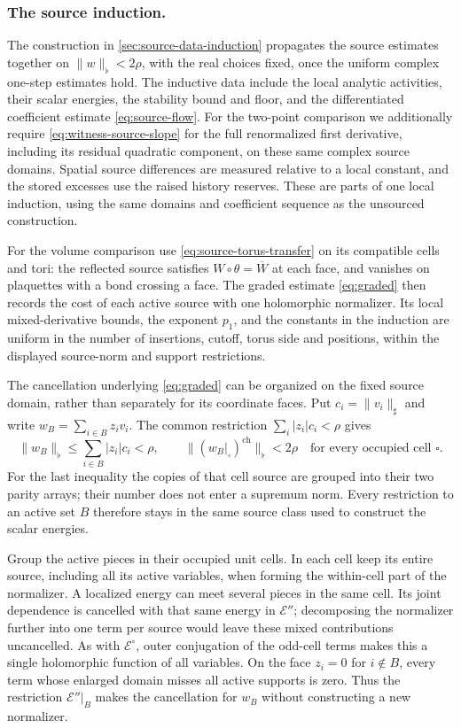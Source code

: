 \documentclass[11pt,letterpaper,reqno]{amsart}
\theoremstyle{definition}
\theoremstyle{remark}
\begin{document}
\subsubsection*{The source induction.}
\label{hyp:sourced-estimates}
The construction in \cref{sec:source-data-induction} propagates the
source estimates together on $\|w\|_\flat<2\rho$, with the real
choices fixed, once the uniform complex one-step estimates hold. The
inductive data include the local analytic activities, their scalar
energies, the stability bound and floor, and the differentiated
coefficient estimate \eqref{eq:source-flow}. For the two-point comparison
we additionally require \eqref{eq:witness-source-slope} for the full
renormalized first derivative, including its residual quadratic
component, on these same complex source domains. Spatial source
differences are measured relative to a local constant, and the stored
excesses use the raised history reserves. These are parts of one local induction, using the
same domains and coefficient sequence as the unsourced construction.

For the volume comparison use \eqref{eq:source-torus-transfer} on its
compatible cells and tori: the reflected source satisfies
$W\circ\theta=\overline W$ at each face, and vanishes on plaquettes
with a bond crossing a face. The graded estimate \eqref{eq:graded}
then records the cost of each active source with one holomorphic
normalizer. Its local mixed-derivative bounds, the exponent $p_1$,
and the constants in the induction are uniform in the number of
insertions, cutoff, torus side and positions, within the displayed
source-norm and support restrictions.

The cancellation underlying \eqref{eq:graded} can be organized
on the fixed source domain, rather than separately for its coordinate
faces. Put $c_i=\|v_i\|_\sharp$ and write
$w_B=\sum_{i\in B}z_iv_i$. The common restriction
$\sum_i|z_i|c_i<\rho$ gives
\[
 \|w_B\|_\flat\le\sum_{i\in B}|z_i|c_i<\rho,
 \qquad
 \|(w_B|_\square)^{\mathrm{ch}}\|_\flat<2\rho
             \quad\text{for every occupied cell }\square.
\]
For the last inequality the copies of that cell source are grouped
into their two parity arrays; their number does not enter a supremum
norm. Every
restriction to an active set $B$ therefore stays in the same
source class used to construct the scalar energies.

Group the active pieces in their occupied unit cells. In each cell
keep its entire source, including all its active variables, when
forming the within-cell part of the normalizer. A localized energy
can meet several pieces in the same cell. Its joint dependence is
cancelled with that same energy in $\mathcal E''$; decomposing
the normalizer further into one term per source would leave these
mixed contributions uncancelled. As with
$\mathcal E^\circ$, outer conjugation of the odd-cell terms
makes this a single holomorphic function of all variables. On the
face $z_i=0$ for $i\notin B$, every term whose enlarged domain
misses all active supports is zero. Thus the restriction
$\mathcal E''|_B$ makes the cancellation for $w_B$ without
constructing a new normalizer.
\end{document}
